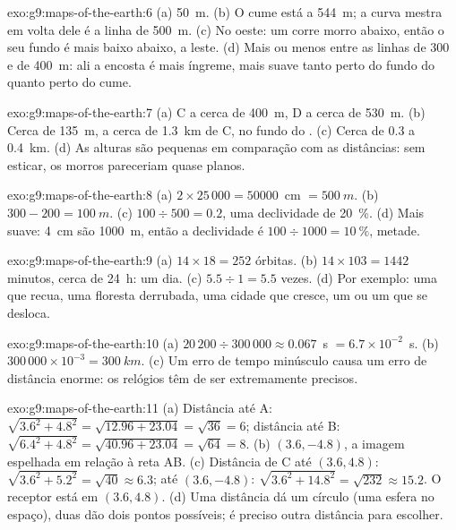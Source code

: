 \begin{solution}{exo:g9:maps-of-the-earth:6}
(a) \qty{50}{m}. (b) O cume está a \qty{544}{m}; a curva mestra em volta
dele é a linha de \qty{500}{m}. (c) No oeste: um  corre morro abaixo,
então o seu fundo é mais baixo  abaixo, a leste. (d) Mais ou menos
entre as linhas de 300 e de \qty{400}{m}: ali a encosta é mais íngreme,
mais suave tanto perto do fundo do  quanto perto do cume.
\end{solution}

\begin{solution}{exo:g9:maps-of-the-earth:7}
(a) C a cerca de \qty{400}{m}, D a cerca de \qty{530}{m}. (b) Cerca de
\qty{135}{m}, a cerca de \qty{1.3}{km} de C, no fundo do . (c) Cerca
de 0.3 a \qty{0.4}{km}. (d) As alturas são pequenas em comparação com as
distâncias: sem esticar, os morros pareceriam quase planos.
\end{solution}

\begin{solution}{exo:g9:maps-of-the-earth:8}
(a) $2 \times 25\,000 = \num{50000}$~cm $= \qty{500}{m}$. (b) $300 - 200 =
\qty{100}{m}$. (c) $100 \div 500 = 0.2$, uma declividade de \qty{20}{\%}.
(d) Mais suave: \qty{4}{cm} são \qty{1000}{m}, então a declividade é
$100 \div 1000 = \qty{10}{\%}$, metade.
\end{solution}

\begin{solution}{exo:g9:maps-of-the-earth:9}
(a) $14 \times 18 = 252$ órbitas. (b) $14 \times 103 = 1442$ minutos,
cerca de \qty{24}{h}: um dia. (c) $5.5 \div 1 = 5.5$ vezes. (d) Por
exemplo: uma  que recua, uma floresta derrubada, uma cidade que
cresce, um  ou um  que se desloca.
\end{solution}

\begin{solution}{exo:g9:maps-of-the-earth:10}
(a) $20\,200 \div 300\,000 \approx 0.067$~s $= 6.7 \times 10^{-2}$~s.
(b) $300\,000 \times 10^{-3} = \qty{300}{km}$. (c) Um erro de tempo
minúsculo causa um erro de distância enorme: os relógios têm de ser
extremamente precisos.
\end{solution}

\begin{solution}{exo:g9:maps-of-the-earth:11}
(a) Distância até A: $\sqrt{3.6^2 + 4.8^2} = \sqrt{12.96 + 23.04} =
\sqrt{36} = 6$; distância até B: $\sqrt{6.4^2 + 4.8^2} = \sqrt{40.96 +
23.04} = \sqrt{64} = 8$. (b) $(3.6, -4.8)$, a imagem espelhada em relação
à reta AB. (c) Distância de C até $(3.6, 4.8)$: $\sqrt{3.6^2 + 5.2^2} =
\sqrt{40} \approx 6.3$; até $(3.6, -4.8)$: $\sqrt{3.6^2 + 14.8^2} =
\sqrt{232} \approx 15.2$. O receptor está em $(3.6, 4.8)$. (d) Uma
distância dá um círculo (uma esfera no espaço), duas dão dois pontos
possíveis; é preciso outra distância para escolher.
\end{solution}

